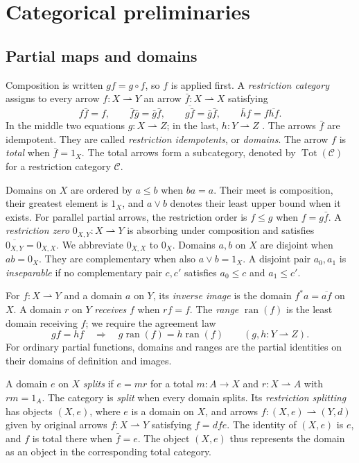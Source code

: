 \documentclass[11pt]{article}
\newcommand{\ran}{\operatorname{ran}}
\begin{document}
\section{Categorical preliminaries}\label{sec:preliminaries}

\subsection{Partial maps and domains}

Composition is written $gf=g\circ f$, so $f$ is applied first.
A \emph{restriction category} assigns to every arrow
$f:X\rightharpoonup Y$ an arrow
$\bar f:X\rightharpoonup X$ satisfying
\[
 f\bar f=f,\qquad
 \bar f\bar g=\bar g\bar f,\qquad
 \overline{g\bar f}=\bar g\bar f,\qquad
 \bar h f=f\overline{hf}.
\]
In the middle two equations $g:X\rightharpoonup Z$; in the last,
$h:Y\rightharpoonup Z$ \cite{CockettLack}.
The arrows $\bar f$ are idempotent. They are called
\emph{restriction idempotents}, or \emph{domains}.
The arrow $f$ is \emph{total} when $\bar f=1_X$.
The total arrows form a subcategory, denoted by
$\operatorname{Tot}(\mathcal C)$ for a restriction category $\mathcal C$.

Domains on $X$ are ordered by $a\le b$ when $ba=a$.
Their meet is composition, their greatest element is $1_X$, and
$a\vee b$ denotes their least upper bound when it exists.
For parallel partial arrows, the restriction order is
$f\le g$ when $f=g\bar f$.
A \emph{restriction zero} $0_{X,Y}:X\rightharpoonup Y$ is
absorbing under composition and satisfies
$\overline{0_{X,Y}}=0_{X,X}$. We abbreviate $0_{X,X}$ to $0_X$.
Domains $a,b$ on $X$ are disjoint when $ab=0_X$.
They are complementary when also $a\vee b=1_X$.
A disjoint pair $a_0,a_1$ is \emph{inseparable} if no complementary
pair $c,c'$ satisfies $a_0\le c$ and $a_1\le c'$.

For $f:X\rightharpoonup Y$ and a domain $a$ on $Y$, its
\emph{inverse image} is the domain $f^*a=\overline{af}$ on $X$.
A domain $r$ on $Y$ \emph{receives} $f$ when $rf=f$.
The \emph{range} $\ran(f)$ is the least domain receiving $f$;
we require the agreement law
\[
 gf=hf\quad\Longrightarrow\quad
 g\ran(f)=h\ran(f)
 \qquad(g,h:Y\rightharpoonup Z).
\]
For ordinary partial functions, domains and ranges are the partial
identities on their domains of definition and images.

A domain $e$ on $X$ \emph{splits} if
$e=mr$ for a total $m:A\to X$ and $r:X\rightharpoonup A$
with $rm=1_A$. The category is \emph{split} when every domain splits.
Its \emph{restriction splitting} has objects $(X,e)$, where $e$ is a
domain on $X$, and arrows
$f:(X,e)\rightharpoonup(Y,d)$ given by original arrows
$f:X\rightharpoonup Y$ satisfying $f=dfe$.
The identity of $(X,e)$ is $e$, and $f$ is total there when
$\bar f=e$. The object $(X,e)$ thus represents the domain as an
object in the corresponding total category.
\end{document}
